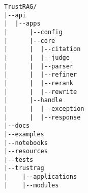 
\begin{lstlisting}
TrustRAG/
|--api
|  |--apps
|      |--config
|      |--core
|      |  |--citation
|      |  |--judge
|      |  |--parser
|      |  |--refiner
|      |  |--rerank
|      |  |--rewrite
|      |--handle
|      |  |--exception
|      |  |--response
|--docs
|--examples
|--notebooks
|--resources
|--tests
|--trustrag
|    |--applications
|    |--modules

\end{lstlisting}
